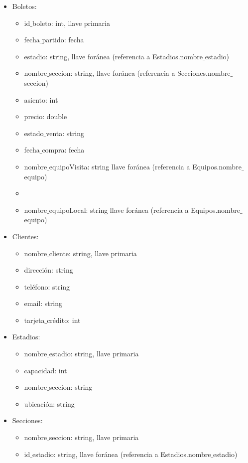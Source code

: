 \begin{itemize}
    \item Boletos:
    \begin{itemize} 
        \item id$\_$boleto: int, llave primaria
        \item fecha$\_$partido: fecha
        \item estadio: string, llave foránea (referencia a Estadios.nombre$\_$estadio)
        \item nombre$\_$seccion: string, llave foránea (referencia a Secciones.nombre$\_$seccion)
        \item asiento: int
        \item precio: double
        \item estado$\_$venta: string
        \item fecha$\_$compra: fecha
        \item nombre$\_$equipoVisita: string llave foránea (referencia a Equipos.nombre$\_$equipo)
        \item \item nombre$\_$equipoLocal: string llave foránea (referencia a Equipos.nombre$\_$equipo)
    \end{itemize}
    \item Clientes:
    \begin{itemize}
        \item nombre$\_$cliente: string, llave primaria
        \item dirección: string
        \item teléfono: string
        \item email: string
        \item tarjeta$\_$crédito: int
    \end{itemize}
    \item Estadios:
    \begin{itemize}
        \item nombre$\_$estadio: string, llave primaria
        \item capacidad: int
        \item nombre$\_$seccion: string
        \item ubicación: string        
    \end{itemize}
    \item Secciones:
    \begin{itemize}
        \item nombre$\_$seccion: string, llave primaria
        \item id$\_$estadio: string, llave foránea (referencia a Estadios.nombre$\_$estadio)

\end{itemize}
\end{itemize}

